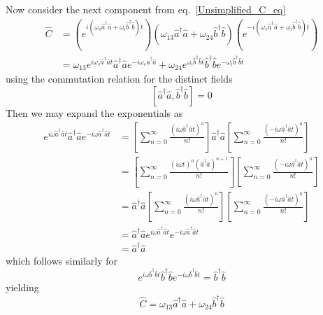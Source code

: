 \documentclass[aps,pra,showpacs,amsmath,amssymb,nofootinbib,longbibliography,superscriptaddress
]{revtex4-1}
\theoremstyle{definition}
\theoremstyle{remark}
\newcommand{\0}{\hat{0}}
\begin{document}
Now consider the next component from eq.~\eqref{Unsimplified_C_eq}
\begin{align}
    \hat{C} &= \left(e^{i(\omega_s \hat{a}^{\dagger} \hat{a} + \omega_i \hat{b}^{\dagger} \hat{b})t}\right) \left(\omega_{13} \hat{a}^{\dagger}\hat{a} + \omega_{24} \hat{b}^{\dagger}\hat{b}\right)\left(e^{-i(\omega_s \hat{a}^{\dagger} \hat{a} + \omega_i \hat{b}^{\dagger} \hat{b})t}\right) \nonumber \\
    &= \omega_{13} e^{i\omega_s \hat{a}^{\dagger} \hat{a}t} \hat{a}^{\dagger}\hat{a} e^{-i\omega_s \hat{a}^{\dagger} \hat{a}} + \omega_{24} e^{\omega_i \hat{b}^{\dagger} \hat{b}t} \hat{b}^{\dagger}\hat{b} e^{-\omega_i \hat{b}^{\dagger} \hat{b}t}
\end{align}
using the commutation relation for the distinct fields
\begin{equation}
    \left[ \hat{a}^{\dagger} \hat{a}, \hat{b}^{\dagger} \hat{b} \right] = 0
\end{equation}
Then we may expand the exponentials as
\begin{align}
    e^{i\omega \hat{a}^{\dagger} \hat{a} t} \hat{a}^{\dagger} \hat{a} e^{-i\omega \hat{a}^{\dagger} \hat{a} t}
    &= \left[\sum_{n=0}^{\infty} \frac{\left(i\omega \hat{a}^{\dagger} \hat{a} t\right)^n}{n!}\right] \hat{a}^{\dagger} \hat{a} \left[\sum_{n=0}^{\infty} \frac{\left(-i\omega \hat{a}^{\dagger} \hat{a} t\right)^n}{n!}\right] \nonumber \\
    &= \left[\sum_{n=0}^{\infty} \frac{\left(i \omega t\right)^n \left(\hat{a}^{\dagger} \hat{a}\right)^{n+1}}{n!}\right] \left[\sum_{n=0}^{\infty} \frac{\left(-i\omega \hat{a}^{\dagger} \hat{a} t\right)^n}{n!}\right] \nonumber \\
    &= \hat{a}^{\dagger} \hat{a} \left[\sum_{n=0}^{\infty} \frac{\left(i\omega \hat{a}^{\dagger} \hat{a} t\right)^n}{n!}\right] \left[\sum_{n=0}^{\infty} \frac{\left(-i\omega \hat{a}^{\dagger} \hat{a} t\right)^n}{n!}\right] \nonumber \\
    &= \hat{a}^{\dagger} \hat{a} e^{i\omega \hat{a}^{\dagger} \hat{a} t}  e^{-i\omega \hat{a}^{\dagger} \hat{a} t} \nonumber \\
    &= \hat{a}^{\dagger} \hat{a}
\end{align}
which follows similarly for
\begin{equation}
    e^{i\omega \hat{b}^{\dagger} \hat{b} t} \hat{b}^{\dagger} \hat{b} e^{-i\omega \hat{b}^{\dagger} \hat{b} t} = \hat{b}^{\dagger} \hat{b}
\end{equation}
yielding
\begin{equation}
    \hat{C} = \omega_{13} \hat{a}^{\dagger}\hat{a} + \omega_{24} \hat{b}^{\dagger}\hat{b}
\end{equation}
\end{document}
